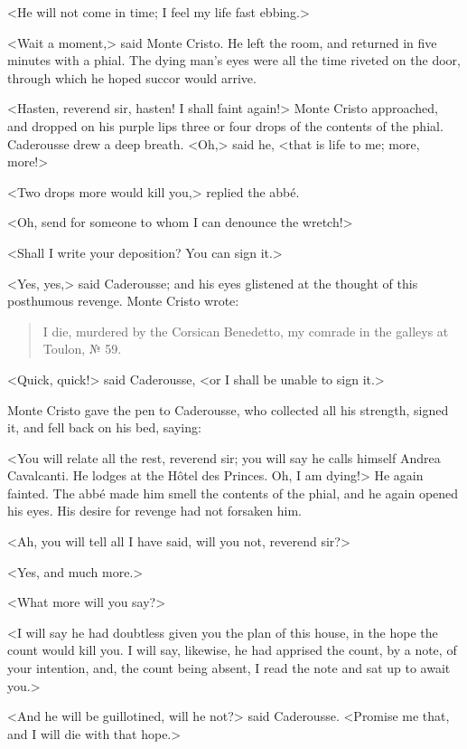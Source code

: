  <He will not come in time; I feel my life fast ebbing.> 

 <Wait a moment,> said Monte Cristo. He left the room, and returned in five minutes with a phial. The dying man's eyes were all the time riveted on the door, through which he hoped succor would arrive. 

 <Hasten, reverend sir, hasten! I shall faint again!> Monte Cristo approached, and dropped on his purple lips three or four drops of the contents of the phial. Caderousse drew a deep breath. <Oh,> said he, <that is life to me; more, more!> 

 <Two drops more would kill you,> replied the abbé. 

 <Oh, send for someone to whom I can denounce the wretch!> 

 <Shall I write your deposition? You can sign it.> 

 <Yes, yes,> said Caderousse; and his eyes glistened at the thought of this posthumous revenge. Monte Cristo wrote:  
 
 \begin{quote}
I die, murdered by the Corsican Benedetto, my comrade in the galleys at Toulon, № 59.
\end{quote}

 <Quick, quick!> said Caderousse, <or I shall be unable to sign it.> 

 Monte Cristo gave the pen to Caderousse, who collected all his strength, signed it, and fell back on his bed, saying: 

 <You will relate all the rest, reverend sir; you will say he calls himself Andrea Cavalcanti. He lodges at the Hôtel des Princes. Oh, I am dying!> He again fainted. The abbé made him smell the contents of the phial, and he again opened his eyes. His desire for revenge had not forsaken him. 

 <Ah, you will tell all I have said, will you not, reverend sir?> 

 <Yes, and much more.> 

 <What more will you say?> 

 <I will say he had doubtless given you the plan of this house, in the hope the count would kill you. I will say, likewise, he had apprised the count, by a note, of your intention, and, the count being absent, I read the note and sat up to await you.> 

 <And he will be guillotined, will he not?> said Caderousse. <Promise me that, and I will die with that hope.> 

